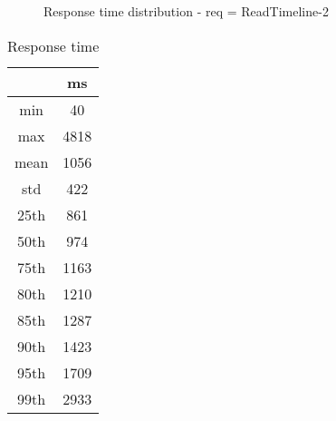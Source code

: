 \begin{minipage}{0.75\linewidth}
\begin{figure}[h]
\begin{adjustbox}{max width=1.0\linewidth, keepaspectratio}
  \end{adjustbox}
  \caption{Response time distribution - req = ReadTimeline-2}
\end{figure}
\end{minipage}\hfill\begin{minipage}{0.18\linewidth}
\begin{table}[h]
\begin{tabular}{|cc|}
\hline
\textbf{} & \textbf{ms}\\ \hline
 \Xhline{0.005\arrayrulewidth}
min & 40\\
 \Xhline{0.005\arrayrulewidth}
max & 4818\\
 \Xhline{0.005\arrayrulewidth}
mean & 1056\\
 \Xhline{0.005\arrayrulewidth}
std & 422\\
\hline
\hline
 \Xhline{0.005\arrayrulewidth}
25th & 861\\
 \Xhline{0.005\arrayrulewidth}
50th & 974\\
 \Xhline{0.005\arrayrulewidth}
75th & 1163\\
 \Xhline{0.005\arrayrulewidth}
80th & 1210\\
 \Xhline{0.005\arrayrulewidth}
85th & 1287\\
 \Xhline{0.005\arrayrulewidth}
90th & 1423\\
 \Xhline{0.005\arrayrulewidth}
95th & 1709\\
 \Xhline{0.005\arrayrulewidth}
99th & 2933\\
\hline
\end{tabular}
\caption{Response time}
\end{table}
\end{minipage}\hfill